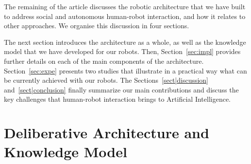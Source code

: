 \documentclass[preprint,3p,times]{elsarticle}
\begin{document}
\vspace{0.5cm}
The remaining of the article discusses the robotic architecture that we have
built to address social and autonomous human-robot interaction, and how it
relates to other approaches. We organise this discussion in four sections.

The next section introduces the architecture as a whole, as well as the
knowledge model that we have developed for our robots. Then,
Section~\ref{sec:impl} provides further details on each of the main components of the architecture.
Section~\ref{sec:expe} presents two studies that illustrate in a practical way
what can be currently achieved with our robots.  The
Sections~\ref{sect|discussion} and~\ref{sect|conclusion} finally summarize our
main contributions and discuss the key challenges that human-robot interaction
brings to Artificial Intelligence.



\section{Deliberative Architecture and Knowledge Model}
\end{document}
